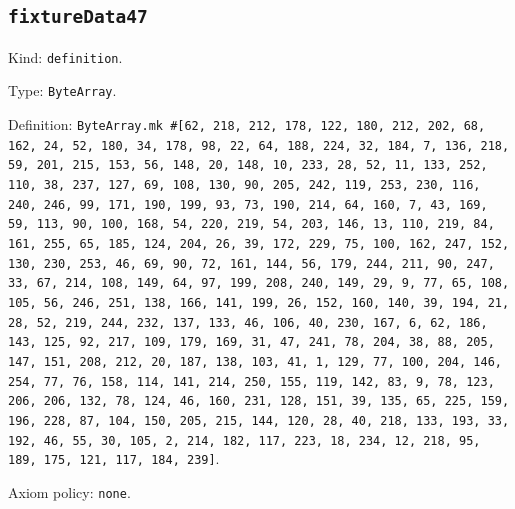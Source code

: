 \documentclass[11pt]{article}
\begin{document}
\subsection*{\texttt{fixtureData47}}
\noindent Kind: \texttt{definition}.\par
\noindent Type: \texttt{ByteArray}.\par
\noindent Definition: \texttt{ByteArray.mk \#[62, 218, 212, 178, 122, 180, 212, 202, 68, 162, 24, 52, 180, 34, 178, 98, 22, 64, 188, 224, 32, 184, 7, 136, 218, 59, 201, 215, 153, 56, 148, 20, 148, 10, 233, 28, 52, 11, 133, 252, 110, 38, 237, 127, 69, 108, 130, 90, 205, 242, 119, 253, 230, 116, 240, 246, 99, 171, 190, 199, 93, 73, 190, 214, 64, 160, 7, 43, 169, 59, 113, 90, 100, 168, 54, 220, 219, 54, 203, 146, 13, 110, 219, 84, 161, 255, 65, 185, 124, 204, 26, 39, 172, 229, 75, 100, 162, 247, 152, 130, 230, 253, 46, 69, 90, 72, 161, 144, 56, 179, 244, 211, 90, 247, 33, 67, 214, 108, 149, 64, 97, 199, 208, 240, 149, 29, 9, 77, 65, 108, 105, 56, 246, 251, 138, 166, 141, 199, 26, 152, 160, 140, 39, 194, 21, 28, 52, 219, 244, 232, 137, 133, 46, 106, 40, 230, 167, 6, 62, 186, 143, 125, 92, 217, 109, 179, 169, 31, 47, 241, 78, 204, 38, 88, 205, 147, 151, 208, 212, 20, 187, 138, 103, 41, 1, 129, 77, 100, 204, 146, 254, 77, 76, 158, 114, 141, 214, 250, 155, 119, 142, 83, 9, 78, 123, 206, 206, 132, 78, 124, 46, 160, 231, 128, 151, 39, 135, 65, 225, 159, 196, 228, 87, 104, 150, 205, 215, 144, 120, 28, 40, 218, 133, 193, 33, 192, 46, 55, 30, 105, 2, 214, 182, 117, 223, 18, 234, 12, 218, 95, 189, 175, 121, 117, 184, 239]}.\par
\noindent Axiom policy: \texttt{none}.\par
\end{document}
